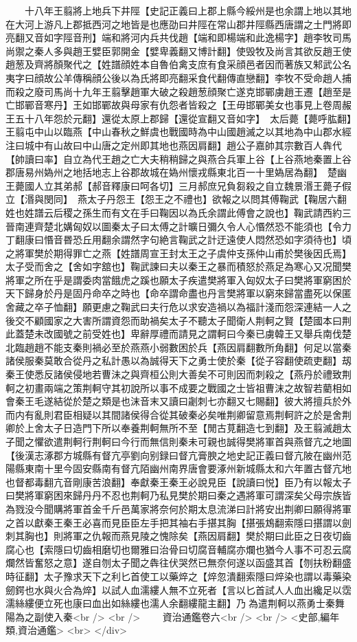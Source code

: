 　　十八年王翦將上地兵下井陘【史記正義曰上郡上縣今綏州是也余謂上地以其地在大河上游凡上郡抵西河之地皆是也應劭曰井陘在常山郡井陘縣西唐謂之土門將即亮翻又音如字陘音刑】端和將河内兵共伐趙【端和即楊端和此逸楊字】趙李牧司馬尚禦之秦人多與趙王嬖臣郭開金【嬖卑義翻又博計翻】使毁牧及尚言其欲反趙王使趙葱及齊將顏聚代之【姓譜顔姓本自魯伯禽支庶有食采顔邑者因而著族又邾武公名夷字曰顔故公羊傳稱顔公後以為氏將即亮翻采食代翻傳直戀翻】李牧不受命趙人捕而殺之廢司馬尚十九年王翦擊趙軍大破之殺趙葱顔聚亡遂克邯鄲虜趙王遷【趙至是亡邯鄲音寒丹】王如邯鄲故與母家有仇怨者皆殺之【王毋邯鄲美女也事見上卷周赧王五十八年怨於元翻】還從太原上郡歸【還從宣翻又音如字】　太后薨【薨呼肱翻】　王翦屯中山以臨燕【中山春秋之鮮虞也戰國時為中山國趙滅之以其地為中山郡水經注曰城中有山故曰中山唐之定州即其地也燕因肩翻】趙公子嘉帥其宗數百人犇代【帥讀曰率】自立為代王趙之亡大夫稍稍歸之與燕合兵軍上谷【上谷燕地秦置上谷郡唐易州媯州之地括地志上谷郡故城在媯州懷戎縣東北百一十里媯居為翻】　楚幽王薨國人立其弟郝【郝音釋康曰呵各切】三月郝庶兄負芻殺之自立魏景湣王薨子假立【湣與閔同】　燕太子丹怨王【怨王之不禮也】欲報之以問其傅鞠武【鞠居六翻姓也姓譜云后稷之孫生而有文在手曰鞠因以為氏余謂此傅會之說也】鞠武請西約三晉南連齊楚北媾匈奴以圖秦太子曰太傅之計曠日彌久令人心惽然恐不能須也【令力丁翻康曰惽音昬恐丘用翻余謂然字句絶言鞠武之計迂遠使人悶然恐如字須待也】頃之將軍樊於期得罪亡之燕【姓譜周宣王封太王之子虞仲支孫仲山甫於樊後因氏焉】太子受而舍之【舍如字舘也】鞠武諫曰夫以秦王之暴而積怒於燕足為寒心又况聞樊將軍之所在乎是謂委肉當餓虎之蹊也願太子疾遣樊將軍入匈奴太子曰樊將軍窮困於天下歸身於丹是固丹命卒之時也【命卒謂命盡也丹言樊將軍以窮來歸當盡死以保匿舍藏之卒子恤翻】願更慮之鞠武曰夫行危以求安造禍以為福計淺而怨深連結一人之後交不顧國家之大害所謂資怨而助禍矣太子不聽太子聞衛人荆軻之賢【楚國本曰荆此蓋楚未改國號之前受姓也】卑辭厚禮而請見之謂軻曰今秦已虜韓王又舉兵南伐楚北臨趙趙不能支秦則禍必至於燕燕小弱數困於兵【燕因肩翻數所角翻】何足以當秦諸侯服秦莫敢合從丹之私計愚以為誠得天下之勇士使於秦【從子容翻使疏吏翻】刼秦王使悉反諸侯侵地若曹沬之與齊桓公則大善矣不可則因而刺殺之【燕丹於禮致荆軻之初畫兩端之策荆軻守其初說所以事不成要之戰國之士皆祖曹沫之故智若藺相如會秦王毛遂結從於楚之類是也沫音末又讀曰劌刺七亦翻又七賜翻】彼大將擅兵於外而内有亂則君臣相疑以其間諸侯得合從其破秦必矣唯荆卿留意焉荆軻許之於是舍荆卿於上舍太子日造門下所以奉養荆軻無所不至【閒古莧翻造七到翻】及王翦滅趙太子聞之懼欲遣荆軻行荆軻曰今行而無信則秦未可親也誠得樊將軍首與燕督亢之地圖【後漢志涿郡方城縣有督亢亭劉向别録曰督亢膏腴之地史記正義曰督亢陂在幽州范陽縣東南十里今固安縣南有督亢陌幽州南界唐會要涿州新城縣太和六年置古督亢地也督都毒翻亢音剛康苦浪翻】奉獻秦王秦王必說見臣【說讀曰悦】臣乃有以報太子曰樊將軍窮困來歸丹丹不忍也荆軻乃私見樊於期曰秦之遇將軍可謂深矣父母宗族皆為戮没今聞購將軍首金千斤邑萬家將奈何於期太息流涕曰計將安出荆卿曰願得將軍之首以獻秦王秦王必喜而見臣臣左手把其袖右手揕其胸【揕張鴆翻索隱曰揕謂以劍刺其胸也】則將軍之仇報而燕見陵之愧除矣【燕因肩翻】樊於期曰此臣之日夜切齒腐心也【索隱曰切齒相磨切也爾雅曰治骨曰切腐音輔腐亦爛也猶今人事不可忍云腐爛然皆奮怒之意】遂自刎太子聞之犇往伏哭然已無奈何遂以函盛其首【刎扶粉翻盛時征翻】太子豫求天下之利匕首使工以藥焠之【焠忽潰翻索隱曰焠染也謂以毒藥染劒鍔也水與火合為焠】以試人血濡縷人無不立死者【言以匕首試人人血出纔足以霑濡絲縷便立死也康曰血出如絲縷也濡人余翻縷龍主翻】乃為遣荆軻以燕勇士秦舞陽為之副使入秦<br />
<br />
　　資治通鑑卷六<br />
<br />
<史部,編年類,資治通鑑>  <br>
   </div> 

